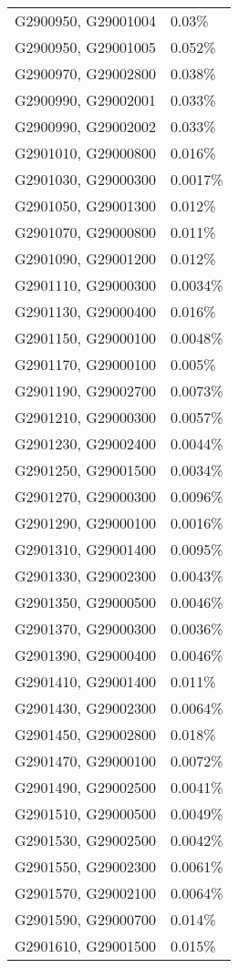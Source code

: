 \begin{longtable}[]{@{}ll@{}}
G2900950, G29001004 & 0.03\% \\
G2900950, G29001005 & 0.052\% \\
G2900970, G29002800 & 0.038\% \\
G2900990, G29002001 & 0.033\% \\
G2900990, G29002002 & 0.033\% \\
G2901010, G29000800 & 0.016\% \\
G2901030, G29000300 & 0.0017\% \\
G2901050, G29001300 & 0.012\% \\
G2901070, G29000800 & 0.011\% \\
G2901090, G29001200 & 0.012\% \\
G2901110, G29000300 & 0.0034\% \\
G2901130, G29000400 & 0.016\% \\
G2901150, G29000100 & 0.0048\% \\
G2901170, G29000100 & 0.005\% \\
G2901190, G29002700 & 0.0073\% \\
G2901210, G29000300 & 0.0057\% \\
G2901230, G29002400 & 0.0044\% \\
G2901250, G29001500 & 0.0034\% \\
G2901270, G29000300 & 0.0096\% \\
G2901290, G29000100 & 0.0016\% \\
G2901310, G29001400 & 0.0095\% \\
G2901330, G29002300 & 0.0043\% \\
G2901350, G29000500 & 0.0046\% \\
G2901370, G29000300 & 0.0036\% \\
G2901390, G29000400 & 0.0046\% \\
G2901410, G29001400 & 0.011\% \\
G2901430, G29002300 & 0.0064\% \\
G2901450, G29002800 & 0.018\% \\
G2901470, G29000100 & 0.0072\% \\
G2901490, G29002500 & 0.0041\% \\
G2901510, G29000500 & 0.0049\% \\
G2901530, G29002500 & 0.0042\% \\
G2901550, G29002300 & 0.0061\% \\
G2901570, G29002100 & 0.0064\% \\
G2901590, G29000700 & 0.014\% \\
G2901610, G29001500 & 0.015\% \\

\end{longtable}

